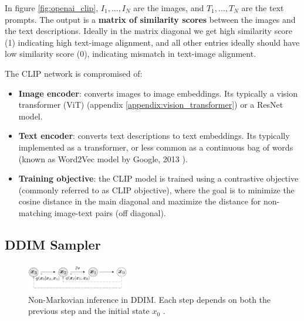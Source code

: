 In figure \ref{fig:openai_clip},  $I_1, ..., I_N$ are the images, and $T_1, ..., T_N$ are the text prompts. The output is a \textbf{matrix of similarity scores} between the images and the text descriptions. Ideally in the matrix diagonal we get high similarity score (1) indicating high text-image alignment, and all other entries ideally should have low similarity score (0), indicating mismatch in text-image alignment.

The CLIP network is compromised of:

\begin{itemize}
    \item \textbf{Image encoder}: converts images to image embeddings. Its typically a vision transformer (ViT) \cite{vision_transformer} (appendix \ref{appendix:vision_transformer}) or a ResNet \cite{resnet} model.
    \item \textbf{Text encoder}: converts text descriptions to text embeddings. Its typically implemented as a transformer, or less common as a continuous bag of words \cite{cbow_word2vec} (known as Word2Vec model by Google, 2013 \cite{cbow_word2vec}).
    \item \textbf{Training objective}: the CLIP model is trained using a contrastive objective (commonly referred to as CLIP objective), where the goal is to minimize the cosine distance in the main diagonal and maximize the distance for non-matching image-text pairs (off diagonal).
\end{itemize}





















\subsection{DDIM Sampler}
\label{subsec:ddim_sampler}

\begin{figure}[ht]
    \centering
    \includegraphics[width=0.4\textwidth]{images/diffusion_models/stable_diffusion/ddim_non_markov_process.png}
    \caption{Non-Markovian inference in DDIM. Each step depends on both the previous step and the initial state $x_0$ \cite{ddim}.}
    \label{fig:ddim_non_markov_process}
\end{figure}

